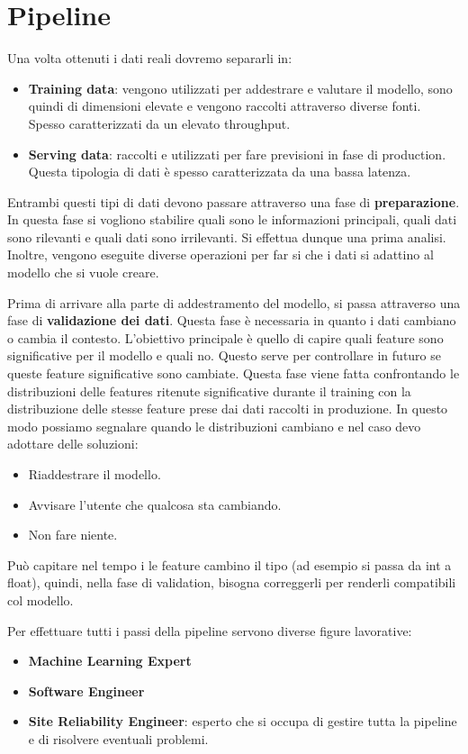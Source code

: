 \section{Pipeline}
Una volta ottenuti i dati reali dovremo separarli in:
\begin{itemize}
      \item \textbf{Training data}: vengono utilizzati per addestrare e valutare
            il modello, sono quindi di dimensioni elevate e vengono raccolti
            attraverso diverse fonti. Spesso caratterizzati da un elevato throughput.
      \item \textbf{Serving data}: raccolti e utilizzati per fare previsioni in
            fase di production. Questa tipologia di dati è spesso caratterizzata
            da una bassa latenza.
\end{itemize}
Entrambi questi tipi di dati devono passare attraverso una fase di \textbf{preparazione}.
In questa fase si vogliono stabilire quali sono le informazioni principali,
quali dati sono rilevanti e quali dati sono irrilevanti. Si effettua dunque una
prima analisi. Inoltre, vengono eseguite diverse operazioni per far si che i dati
si adattino al modello che si vuole creare.

Prima di arrivare alla parte di addestramento del modello, si passa attraverso una
fase di \textbf{validazione dei dati}. Questa fase è necessaria in quanto i dati cambiano
o cambia il contesto.
L'obiettivo principale è quello di capire quali feature sono significative
per il modello e quali no. Questo serve per controllare in futuro se queste
feature significative sono cambiate.
Questa fase viene fatta confrontando le distribuzioni delle features ritenute
significative durante il training con la distribuzione delle stesse feature prese
dai dati raccolti in produzione.
In questo modo possiamo segnalare quando le distribuzioni cambiano e nel caso devo
adottare delle soluzioni:
\begin{itemize}
      \item Riaddestrare il modello.
      \item Avvisare l'utente che qualcosa sta cambiando.
      \item Non fare niente.
\end{itemize}
Può capitare nel tempo i le feature cambino il tipo (ad esempio si passa da int
a float), quindi, nella fase di validation, bisogna correggerli per renderli
compatibili col modello.

Per effettuare tutti i passi della pipeline servono diverse figure lavorative:
\begin{itemize}
      \item \textbf{Machine Learning Expert}
      \item \textbf{Software Engineer}
      \item \textbf{Site Reliability Engineer}: esperto che si occupa di gestire
            tutta la pipeline e di risolvere eventuali problemi.
\end{itemize}

